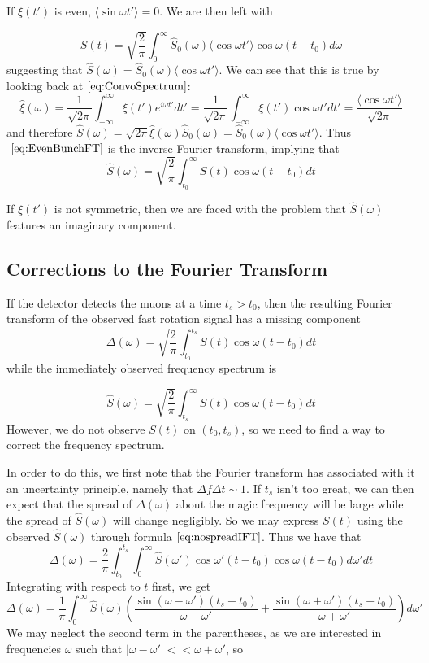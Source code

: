 If $\xi(t')$ is even, $\langle\sin\omega t'\rangle=0$. We are then left with 

\begin{equation}
S(t)=\sqrt{\frac{2}{\pi}}\int^{\infty}_0\hat{S}_0(\omega)\langle\cos\omega t'\rangle\cos\omega(t-t_0)d\omega
\label{eq:EvenBunchFT}
\end{equation} suggesting that $\hat{S}(\omega)=\hat{S}_0(\omega)\langle\cos\omega t'\rangle$. We can see that this is true by looking back at$~\eqref{eq:ConvoSpectrum}$: \[\hat{\xi}(\omega)=\frac{1}{\sqrt{2\pi}}\int^{\infty}_{-\infty}\xi(t')e^{i\omega t'}dt'=\frac{1}{\sqrt{2\pi}}\int^{\infty}_{-\infty}\xi(t')\cos\omega t'dt'=\frac{\langle\cos\omega t'\rangle}{\sqrt{2\pi}}\] and therefore $\hat{S}(\omega)=\sqrt{2\pi}\hat{\xi}(\omega)\hat{S}_0(\omega)=\hat{S}_0(\omega)\langle\cos\omega t'\rangle$. Thus $~\eqref{eq:EvenBunchFT}$ is the inverse Fourier transform, implying that \[\hat{S}(\omega)=\sqrt{\frac{2}{\pi}}\int^{\infty}_{t_0}S(t)\cos\omega(t-t_0)dt\] 

If $\xi(t')$ is not symmetric, then we are faced with the problem that $\hat{S}(\omega)$ features an imaginary component.

\subsection{Corrections to the Fourier Transform}

If the detector detects the muons at a time $t_s>t_0$, then the resulting Fourier transform of the observed fast rotation signal has a missing component 
\begin{equation}
\Delta(\omega)=\sqrt{\frac{2}{\pi}}\int^{t_s}_{t_0}S(t)\cos\omega(t-t_0)dt
\label{eq:Delta}
\end{equation} while the immediately observed frequency spectrum is 

\begin{equation}
\hat{S}(\omega)=\sqrt{\frac{2}{\pi}}\int^{\infty}_{t_s}S(t)\cos\omega(t-t_0)dt
\label{eq:firstapprox}
\end{equation}
However, we do not observe $S(t)$ on $(t_0,t_s)$, so we need to find a way to correct the frequency spectrum. 

In order to do this, we first note that the Fourier transform has associated with it an uncertainty principle, namely that $\Delta f\Delta t\sim1$. If $t_s$ isn't too great, we can then expect that the spread of $\Delta(\omega)$ about the magic frequency will be large while the spread of $\hat{S}(\omega)$ will change negligibly. So we may express $S(t)$ using the observed $\hat{S}(\omega)$ through formula$~\eqref{eq:nospreadIFT}$. Thus we have that \[\Delta(\omega)=\frac{2}{\pi}\int^{t_s}_{t_0}\int^{\infty}_0\hat{S}(\omega')\cos\omega'(t-t_0)\cos\omega(t-t_0)d\omega' dt\] Integrating with respect to $t$ first, we get \[\Delta(\omega)=\frac{1}{\pi}\int^{\infty}_0\hat{S}(\omega)\left(\frac{\sin(\omega-\omega')(t_s-t_0)}{\omega-\omega'}+\frac{\sin(\omega+\omega')(t_s-t_0)}{\omega+\omega'}\right)d\omega'\] We may neglect the second term in the parentheses, as we are interested in frequencies $\omega$ such that $|\omega-\omega'|<<\omega+\omega'$, so 

